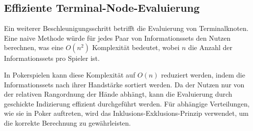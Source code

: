 \subsection{Effiziente Terminal-Node-Evaluierung}

Ein weiterer Beschleunigungsschritt betrifft die Evaluierung von Terminalknoten.
Eine naive Methode würde für jedes Paar von Informationssets den Nutzen berechnen, was eine $O(n^2)$ Komplexität bedeutet, wobei $n$ die Anzahl der Informationssets pro Spieler ist.

In Pokerspielen kann diese Komplexität auf $O(n)$ reduziert werden, indem die Informationssets nach ihrer Handstärke sortiert werden.
Da der Nutzen nur von der relativen Rangordnung der Hände abhängt, kann die Evaluierung durch geschickte Indizierung effizient durchgeführt werden.
Für abhängige Verteilungen, wie sie in Poker auftreten, wird das Inklusions-Exklusions-Prinzip verwendet, um die korrekte Berechnung zu gewährleisten.
